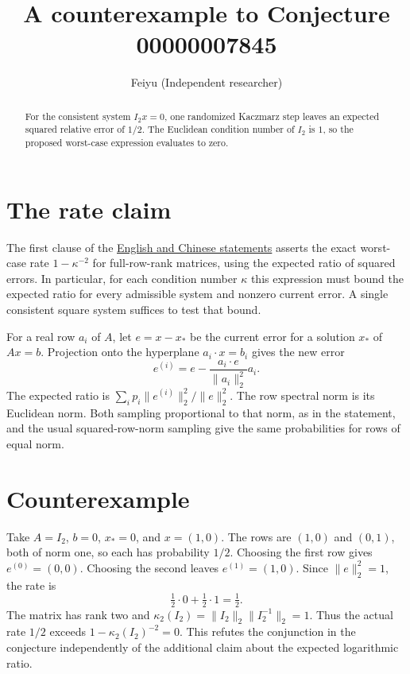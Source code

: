 \documentclass[11pt]{article}
\title{A counterexample to Conjecture 00000007845}
\author{Feiyu (Independent researcher)}
\date{}
\begin{document}
\maketitle

\begin{abstract}
For the consistent system $I_2x=0$, one randomized Kaczmarz step leaves
an expected squared relative error of $1/2$. The Euclidean condition
number of $I_2$ is $1$, so the proposed worst-case expression evaluates
to zero.
\end{abstract}

\section*{The rate claim}
The first clause of the \href{https://github.com/The-Last-Math-Competition/The-Last-Math-Competition/blob/main/conjectures/00000007845.md}{English and Chinese statements}
asserts the exact worst-case rate $1-\kappa^{-2}$ for full-row-rank
matrices, using the expected ratio of squared errors. In particular,
for each condition number $\kappa$ this expression must bound the
expected ratio for every admissible system and nonzero current error.
A single consistent square system suffices to test that bound.

For a real row $a_i$ of $A$, let $e=x-x_*$ be the current error for a
solution $x_*$ of $Ax=b$. Projection onto the hyperplane
$a_i\cdot x=b_i$ gives the new error
\[
   e^{(i)}=e-\frac{a_i\cdot e}{\|a_i\|_2^2}a_i.
\]
The expected ratio is $\sum_i p_i\|e^{(i)}\|_2^2/\|e\|_2^2$.
The row spectral norm is its Euclidean norm. Both sampling proportional
to that norm, as in the statement, and the usual squared-row-norm
sampling give the same probabilities for rows of equal norm.

\section*{Counterexample}
Take $A=I_2$, $b=0$, $x_*=0$, and $x=(1,0)$. The rows are $(1,0)$ and
$(0,1)$, both of norm one, so each has probability $1/2$. Choosing the
first row gives $e^{(0)}=(0,0)$. Choosing the second leaves
$e^{(1)}=(1,0)$. Since $\|e\|_2^2=1$, the rate is
\[
  \tfrac12\cdot 0+\tfrac12\cdot 1=\tfrac12.
\]
The matrix has rank two and
$\kappa_2(I_2)=\|I_2\|_2\|I_2^{-1}\|_2=1$.
Thus the actual rate $1/2$ exceeds $1-\kappa_2(I_2)^{-2}=0$.
This refutes the conjunction in the conjecture independently of the
additional claim about the expected logarithmic ratio.
\end{document}

